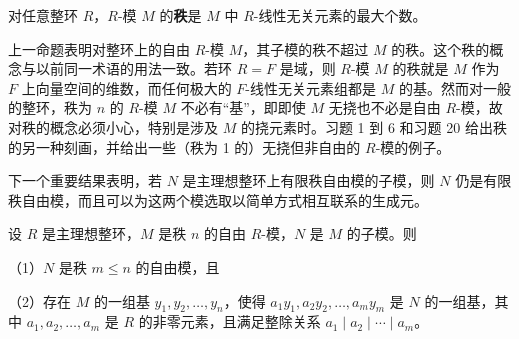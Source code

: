\begin{definition}
对任意整环 \(R\)，\(R\)-模 \(M\) 的\textbf{秩}是 \(M\) 中 \(R\)-线性无关元素的最大个数。
\end{definition}

上一命题表明对整环上的自由 \(R\)-模 \(M\)，其子模的秩不超过 \(M\) 的秩。这个秩的概念与以前同一术语的用法一致。若环 \(R = F\) 是域，则 \(R\)-模 \(M\) 的秩就是 \(M\) 作为 \(F\) 上向量空间的维数，而任何极大的 \(F\)-线性无关元素组都是 \(M\) 的基。然而对一般的整环，秩为 \(n\) 的 \(R\)-模 \(M\) 不必有“基”，即即使 \(M\) 无挠也不必是自由 \(R\)-模，故对秩的概念必须小心，特别是涉及 \(M\) 的挠元素时。习题 1 到 6 和习题 20 给出秩的另一种刻画，并给出一些（秩为 1 的）无挠但非自由的 \(R\)-模的例子。

下一个重要结果表明，若 \(N\) 是主理想整环上有限秩自由模的子模，则 \(N\) 仍是有限秩自由模，而且可以为这两个模选取以简单方式相互联系的生成元。

\begin{theorem}\label{thm:12.4}
设 \(R\) 是主理想整环，\(M\) 是秩 \(n\) 的自由 \(R\)-模，\(N\) 是 \(M\) 的子模。则

（1）\(N\) 是秩 \(m \leq n\) 的自由模，且

（2）存在 \(M\) 的一组基 \(y_1, y_2, \ldots, y_n\)，使得 \(a_1y_1, a_2y_2, \ldots, a_my_m\) 是 \(N\) 的一组基，其中 \(a_1, a_2, \ldots, a_m\) 是 \(R\) 的非零元素，且满足整除关系 \(a_1 \mid a_2 \mid \cdots \mid a_m\)。
\end{theorem}

